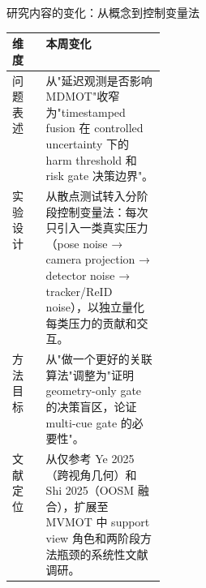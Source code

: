 \documentclass[aspectratio=169,xcolor=dvipsnames]{beamer}
\begin{document}
\begin{frame}{研究内容的变化：从概念到控制变量法}
\scriptsize
\begin{tabularx}{\linewidth}{p{0.22\linewidth} X}
\toprule
维度 & 本周变化 \\
\midrule
问题表述 &
从"延迟观测是否影响 MDMOT"收窄为"timestamped fusion 在 controlled uncertainty 下的 harm threshold 和 risk gate 决策边界"。\\
\addlinespace
实验设计 &
从散点测试转入分阶段控制变量法：每次只引入一类真实压力（pose noise → camera projection → detector noise → tracker/ReID noise），以独立量化每类压力的贡献和交互。\\
\addlinespace
方法目标 &
从"做一个更好的关联算法"调整为"证明 geometry-only gate 的决策盲区，论证 multi-cue gate 的必要性"。\\
\addlinespace
文献定位 &
从仅参考 Ye 2025（跨视角几何）和 Shi 2025（OOSM 融合），扩展至 MVMOT 中 support view 角色和两阶段方法瓶颈的系统性文献调研。\\
\bottomrule
\end{tabularx}
\end{frame}

\end{document}
